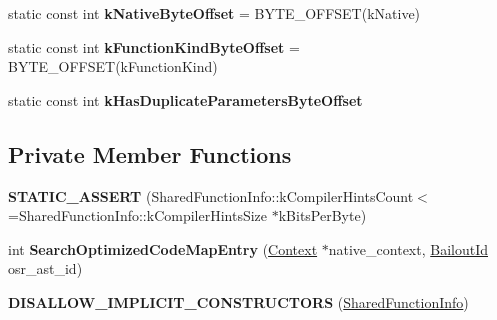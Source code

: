 \begin{DoxyCompactItemize}
\item 
static const int {\bfseries k\+Native\+Byte\+Offset} = B\+Y\+T\+E\+\_\+\+O\+F\+F\+S\+ET(k\+Native)\hypertarget{classv8_1_1internal_1_1_shared_function_info_a3143a66b30b720795490b470e9882d42}{}\label{classv8_1_1internal_1_1_shared_function_info_a3143a66b30b720795490b470e9882d42}

\item 
static const int {\bfseries k\+Function\+Kind\+Byte\+Offset} = B\+Y\+T\+E\+\_\+\+O\+F\+F\+S\+ET(k\+Function\+Kind)\hypertarget{classv8_1_1internal_1_1_shared_function_info_af14d25a43449832b2c005fb074d61c65}{}\label{classv8_1_1internal_1_1_shared_function_info_af14d25a43449832b2c005fb074d61c65}

\item 
static const int {\bfseries k\+Has\+Duplicate\+Parameters\+Byte\+Offset}
\end{DoxyCompactItemize}
\subsection*{Private Member Functions}
\begin{DoxyCompactItemize}
\item 
{\bfseries S\+T\+A\+T\+I\+C\+\_\+\+A\+S\+S\+E\+RT} (Shared\+Function\+Info\+::k\+Compiler\+Hints\+Count$<$=Shared\+Function\+Info\+::k\+Compiler\+Hints\+Size $\ast$k\+Bits\+Per\+Byte)\hypertarget{classv8_1_1internal_1_1_shared_function_info_a8c792ecef26bec82940631a9c35a5c2c}{}\label{classv8_1_1internal_1_1_shared_function_info_a8c792ecef26bec82940631a9c35a5c2c}

\item 
int {\bfseries Search\+Optimized\+Code\+Map\+Entry} (\hyperlink{classv8_1_1internal_1_1_context}{Context} $\ast$native\+\_\+context, \hyperlink{classv8_1_1internal_1_1_bailout_id}{Bailout\+Id} osr\+\_\+ast\+\_\+id)\hypertarget{classv8_1_1internal_1_1_shared_function_info_a72b075706f6665a2e783332d2deef595}{}\label{classv8_1_1internal_1_1_shared_function_info_a72b075706f6665a2e783332d2deef595}

\item 
{\bfseries D\+I\+S\+A\+L\+L\+O\+W\+\_\+\+I\+M\+P\+L\+I\+C\+I\+T\+\_\+\+C\+O\+N\+S\+T\+R\+U\+C\+T\+O\+RS} (\hyperlink{classv8_1_1internal_1_1_shared_function_info}{Shared\+Function\+Info})\hypertarget{classv8_1_1internal_1_1_shared_function_info_a89b64f7f4fcefcac5986c726da691b6c}{}\label{classv8_1_1internal_1_1_shared_function_info_a89b64f7f4fcefcac5986c726da691b6c}

\end{DoxyCompactItemize}
